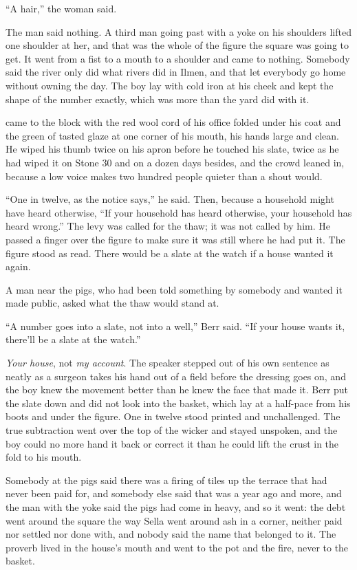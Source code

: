 “A hair,” the woman said.

The man said nothing. A third man going past with a yoke on his shoulders lifted one shoulder at her, and that was the whole of the figure the square was going to get. It went from a fist to a mouth to a shoulder and came to nothing. Somebody said the river only did what rivers did in Ilmen, and that let everybody go home without owning the day. The boy lay with cold iron at his cheek and kept the shape of the number exactly, which was more than the yard did with it.

 came to the block with the red wool cord of his office folded under his coat and the green of tasted glaze at one corner of his mouth, his hands large and clean. He wiped his thumb twice on his apron before he touched his slate, twice as he had wiped it on Stone 30 and on a dozen days besides, and the crowd leaned in, because a low voice makes two hundred people quieter than a shout would.

“One in twelve, as the notice says,” he said. Then, because a household might have heard otherwise, “If your household has heard otherwise, your household has heard wrong.” The levy was called for the thaw; it was not called by him. He passed a finger over the figure to make sure it was still where he had put it. The figure stood as read. There would be a slate at the watch if a house wanted it again.

A man near the pigs, who had been told something by somebody and wanted it made public, asked what the thaw would stand at.

“A number goes into a slate, not into a well,” Berr said. “If your house wants it, there'll be a slate at the watch.”

\emph{Your house}, not \emph{my account}. The speaker stepped out of his own sentence as neatly as a surgeon takes his hand out of a field before the dressing goes on, and the boy knew the movement better than he knew the face that made it. Berr put the slate down and did not look into the basket, which lay at a half-pace from his boots and under the figure. One in twelve stood printed and unchallenged. The true subtraction went over the top of the wicker and stayed unspoken, and the boy could no more hand it back or correct it than he could lift the crust in the fold to his mouth.

Somebody at the pigs said there was a firing of tiles up the terrace that had never been paid for, and somebody else said that was a year ago and more, and the man with the yoke said the pigs had come in heavy, and so it went: the debt went around the square the way Sella went around ash in a corner, neither paid nor settled nor done with, and nobody said the name that belonged to it. The proverb lived in the house's mouth and went to the pot and the fire, never to the basket.

